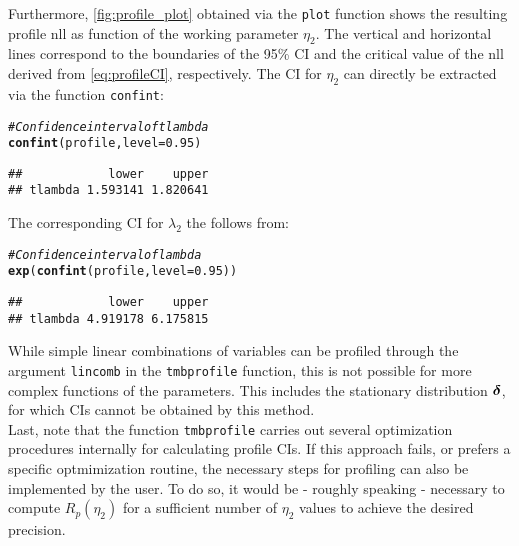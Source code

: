 \documentclass[bimj,fleqn]{w-art}\usepackage[]{graphicx}\usepackage[]{color}
\makeatletter
\newcommand{\hlnum}[1]{\textcolor[rgb]{0.686,0.059,0.569}{#1}}%
\newcommand{\hlcom}[1]{\textcolor[rgb]{0.678,0.584,0.686}{\textit{#1}}}%
\newcommand{\hlstd}[1]{\textcolor[rgb]{0.345,0.345,0.345}{#1}}%
\newcommand{\hlkwc}[1]{\textcolor[rgb]{0.333,0.667,0.333}{#1}}%
\newcommand{\hlkwd}[1]{\textcolor[rgb]{0.737,0.353,0.396}{\textbf{#1}}}%
\newenvironment{kframe}{%
 \def\at@end@of@kframe{}%
 \ifinner\ifhmode%
  \def\at@end@of@kframe{\end{minipage}}%
  \begin{minipage}{\columnwidth}%
 \fi\fi%
 \def\FrameCommand##1{\hskip\@totalleftmargin \hskip-\fboxsep
 \colorbox{shadecolor}{##1}\hskip-\fboxsep
     \hskip-\linewidth \hskip-\@totalleftmargin \hskip\columnwidth}%
 \MakeFramed {\advance\hsize-\width
   \@totalleftmargin\z@ \linewidth\hsize
   \@setminipage}}%
 {\par\unskip\endMakeFramed%
 \at@end@of@kframe}
\newenvironment{knitrout}{}{} %
\newcommand{\bfdelta}{\mbox{\boldmath $\delta$}}
\theoremstyle{plain}
\theoremstyle{definition}
\makeatother
\begin{document}
Furthermore, \autoref{fig:profile_plot} obtained via the \texttt{plot} function shows the resulting profile nll as function of the working parameter $\eta_2$. The vertical and horizontal lines correspond to the boundaries of the 95\% CI and the critical value of the nll derived from \autoref{eq:profileCI}, respectively. The CI for $\eta_2$ can directly be extracted via the function \texttt{confint}:
\begin{knitrout}
\color{fgcolor}\begin{kframe}
\begin{alltt}
\hlcom{# Confidence interval of tlambda}
\hlkwd{confint}\hlstd{(profile,} \hlkwc{level} \hlstd{=} \hlnum{0.95}\hlstd{)}
\end{alltt}
\begin{verbatim}
##            lower    upper
## tlambda 1.593141 1.820641
\end{verbatim}
\end{kframe}
\end{knitrout}
The corresponding CI for $\lambda_2$ the follows from:
\begin{knitrout}
\color{fgcolor}\begin{kframe}
\begin{alltt}
\hlcom{# Confidence interval of lambda}
\hlkwd{exp}\hlstd{(}\hlkwd{confint}\hlstd{(profile,} \hlkwc{level} \hlstd{=} \hlnum{0.95}\hlstd{))}
\end{alltt}
\begin{verbatim}
##            lower    upper
## tlambda 4.919178 6.175815
\end{verbatim}
\end{kframe}
\end{knitrout}
While simple linear combinations of variables can be profiled through the argument \texttt{lincomb} in the \texttt{tmbprofile} function, this is not possible for more complex functions of the parameters. This includes the stationary distribution $\bfdelta$, for which CIs cannot be obtained by this method.\\
Last, note that the function \texttt{tmbprofile} carries out several optimization procedures internally for calculating profile CIs. If this approach fails, or prefers a specific optmimization routine, the necessary steps for profiling can also be implemented by the user. To do so, it would be - roughly speaking - necessary to compute $R_p(\eta_2)$ for a sufficient number of $\eta_2$ values to achieve the desired precision.
\end{document}
